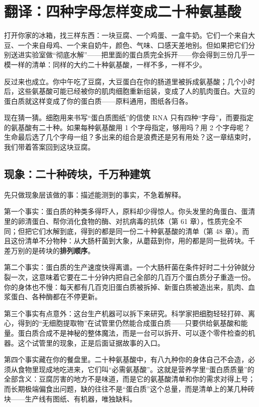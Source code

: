 \chapter{翻译：四种字母怎样变成二十种氨基酸}

\begin{kaichang}
打开你家的冰箱，找三样东西：一块豆腐、一个鸡蛋、一盒牛奶。它们一个来自大豆、一个来自母鸡、一个来自奶牛，颜色、气味、口感天差地别。但如果把它们分别送进实验室做“彻底水解”——把里面的蛋白质完全拆开——你会得到三份几乎一模一样的清单：同样的大约二十种氨基酸，一样不多，一样不少。

反过来也成立。你中午吃了豆腐，大豆蛋白在你的肠道里被拆成氨基酸；几个小时后，这些氨基酸可能已经被你的肌肉细胞重新组装，变成了人的肌肉蛋白。大豆的蛋白质就这样变成了你的蛋白质——原料通用，图纸各归各。

现在猜一猜。细胞用来书写“蛋白质图纸”的信使 RNA 只有四种“字母”，而要指定的氨基酸有二十种。如果每种氨基酸用 1 个字母指定，够用吗？用 2 个字母呢？生命最后选了几个字母一组？多出来的组合是浪费还是另有用处？这一章结束时，我们带着答案回到这块豆腐。
\end{kaichang}

\section{现象：二十种砖块，千万种建筑}

先只做现象层该做的事：描述能测到的事实，不急着解释。

第一个事实：蛋白质的种类多得吓人，原料却少得惊人。你头发里的角蛋白、蛋清里的卵清蛋白、帮你消化食物的酶、对抗病毒的抗体（第 61 章），性质完全不同；但把它们水解到底，得到的都是同一份二十种氨基酸的清单（第 48 章）。而且这份清单不分物种：从大肠杆菌到大象，从蘑菇到你，用的都是同一批砖块。千差万别的是砖块的\textbf{排列顺序}。

第二个事实：蛋白质的生产速度快得离谱。一个大肠杆菌在条件好时二十分钟就分裂一次，这意味着它要在二十分钟内把自己全部的几百万个蛋白质分子重造一份。你的身体也不慢：每天都有几百克旧蛋白质被拆掉、新蛋白质被造出来，肌肉、血浆蛋白、各种酶都在不停更新。

第三个事实有点意外：这台生产机器可以拆下来研究。科学家把细胞轻轻打碎、离心，得到的“无细胞提取物”在试管里仍然能合成蛋白质——只要供给氨基酸和能量。蛋白质合成不是神秘的整体魔法，而是一台可以拆开、可以逐个零件检查的机器。这个试管里的现象，正是后面证据故事的入口。

第四个事实藏在你的餐盘里。二十种氨基酸中，有八九种你的身体自己不会造，必须从食物里现成地吃进来，它们叫“必需氨基酸”。这就是营养学里“蛋白质质量”的全部含义：豆腐厉害的地方不是味道，而是它的氨基酸清单和你的需求对得上号；而长期极端偏食出问题，缺的往往不是“蛋白质”这个总量，而是清单上的某几种砖块——生产线有图纸、有机器，唯独缺料。


